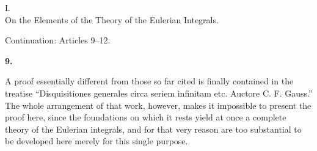 \documentclass[11pt]{article}
\newcommand{\art}[1]{\bigskip\begin{center}\large\bfseries #1.\end{center}\nopagebreak}
\begin{document}
\begin{center}
{\Large I.\\[0.4em] On the Elements of the Theory of the Eulerian Integrals.}\par
\medskip
{\normalsize Continuation: Articles 9--12.}
\end{center}

\art{9}

A proof essentially different from those so far cited is finally contained in the treatise “Disquisitiones generales circa seriem infinitam etc. Auctore C. F. Gauss.” The whole arrangement of that work, however, makes it impossible to present the proof here, since the foundations on which it rests yield at once a complete theory of the Eulerian integrals, and for that very reason are too substantial to be developed here merely for this single purpose.
\end{document}
